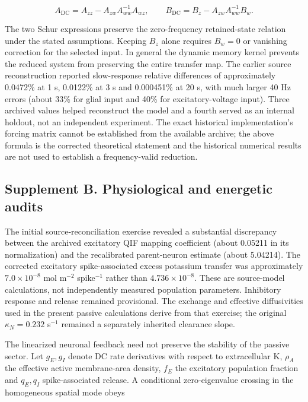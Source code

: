 \documentclass[
  11pt,
]{article}
\begin{document}
\[A_{\mathrm{DC}}=A_{zz}-A_{zw}A_{ww}^{-1}A_{wz},\qquad B_{\mathrm{DC}}=B_z-A_{zw}A_{ww}^{-1}B_w.\]

The two Schur expressions preserve the zero-frequency retained-state
relation under the stated assumptions. Keeping \(B_z\) alone requires
\(B_w=0\) or vanishing correction for the selected input. In general the
dynamic memory kernel prevents the reduced system from preserving the
entire transfer map. The earlier source reconstruction reported
slow-response relative differences of approximately 0.0472\% at 1 s,
0.0122\% at 3 s and 0.000451\% at 20 s, with much larger 40 Hz errors
(about 33\% for glial input and 40\% for excitatory-voltage input).
Three archived values helped reconstruct the model and a fourth served
as an internal holdout, not an independent experiment. The exact
historical implementation's forcing matrix cannot be established from
the available archive; the above formula is the corrected theoretical
statement and the historical numerical results are not used to establish
a frequency-valid reduction.

\subsection{Supplement B. Physiological and energetic
audits}\label{supplement-b.-physiological-and-energetic-audits}

The initial source-reconciliation exercise revealed a substantial
discrepancy between the archived excitatory QIF mapping coefficient
(about 0.05211 in its normalization) and the recalibrated parent-neuron
estimate (about 5.04214). The corrected excitatory spike-associated
excess potassium transfer was approximately \(7.0\times10^{-8}\) mol
m\(^{-2}\) spike\(^{-1}\) rather than \(4.736\times10^{-8}\). These are
source-model calculations, not independently measured population
parameters. Inhibitory response and release remained provisional. The
exchange and effective diffusivities used in the present passive
calculations derive from that exercise; the original \(\kappa_N=0.232\)
s\(^{-1}\) remained a separately inherited clearance slope.

The linearized neuronal feedback need not preserve the stability of the
passive sector. Let \(g_E,g_I\) denote DC rate derivatives with respect
to extracellular K, \(\rho_A\) the effective active membrane-area
density, \(f_E\) the excitatory population fraction and \(q_E,q_I\)
spike-associated release. A conditional zero-eigenvalue crossing in the
homogeneous spatial mode obeys
\end{document}
